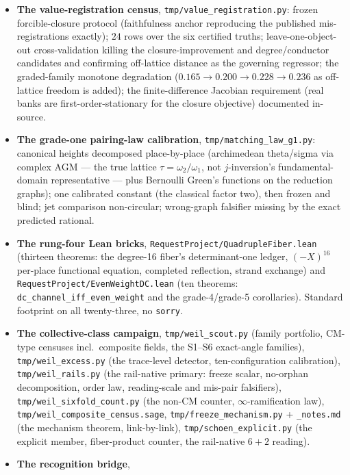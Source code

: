 \documentclass[11pt]{article}
\theoremstyle{definition}
\theoremstyle{remark}
\begin{document}
\begin{itemize}
own state; the carrier translation of the even-rung construction arm.
\item \textbf{The value-registration census},
\texttt{tmp/value\_registration.py}: frozen forcible-closure protocol
(faithfulness anchor reproducing the published mis-registrations exactly);
$24$ rows over the six certified truths; leave-one-object-out
cross-validation killing the closure-improvement and degree/conductor
candidates and confirming off-lattice distance as the governing regressor;
the graded-family monotone degradation ($0.165\to0.200\to0.228\to0.236$ as
off-lattice freedom is added); the finite-difference Jacobian requirement
(real banks are first-order-stationary for the closure objective) documented
in-source.
\item \textbf{The grade-one pairing-law calibration},
\texttt{tmp/matching\_law\_g1.py}: canonical heights decomposed
place-by-place (archimedean theta/sigma via complex AGM --- the true lattice
$\tau=\omega_2/\omega_1$, not $j$-inversion's fundamental-domain
representative --- plus Bernoulli Green's functions on the reduction graphs);
one calibrated constant (the classical factor two), then frozen and blind;
jet comparison non-circular; wrong-graph falsifier missing by the exact
predicted rational.
\item \textbf{The rung-four Lean bricks},
\texttt{RequestProject/QuadrupleFiber.lean} (thirteen theorems: the degree-16
fiber's determinant-one ledger, $(-X)^{16}$ per-place functional equation,
completed reflection, strand exchange) and
\texttt{RequestProject/EvenWeightDC.lean} (ten theorems:
\texttt{dc\_channel\_iff\_even\_weight} and the grade-4/grade-5 corollaries).
Standard footprint on all twenty-three, no \texttt{sorry}.
\item \textbf{The collective-class campaign},
\texttt{tmp/weil\_scout.py} (family portfolio, CM-type censuses incl.\
composite fields, the S1--S6 exact-angle families),
\texttt{tmp/weil\_excess.py} (the trace-level detector, ten-configuration
calibration), \texttt{tmp/weil\_rails.py} (the rail-native primary:
freeze scalar, no-orphan decomposition, order law, reading-scale and
mis-pair falsifiers), \texttt{tmp/weil\_sixfold\_count.py} (the non-CM
counter, $\infty$-ramification law), \texttt{tmp/weil\_composite\_census.sage},
\texttt{tmp/freeze\_mechanism.py} + \texttt{\_notes.md} (the mechanism
theorem, link-by-link), \texttt{tmp/schoen\_explicit.py} (the explicit
member, fiber-product counter, the rail-native $6+2$ reading).
\item \textbf{The recognition bridge},

\end{itemize}
\end{document}
